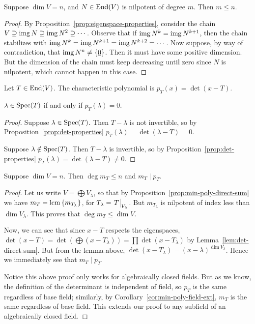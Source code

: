 \begin{lemma}\label{lem:nilpotent-degree}
    Suppose \(\dim V = n\), and \(N \in \operatorname{End}(V)\) is nilpotent of degree \(m\).
    Then \(m \leq n\).
\end{lemma}
\begin{proof}
    By Proposition~\ref{prop:eigenspace-properties},
    consider the chain \(V \supseteq \operatorname{img} N \supseteq \operatorname{img} N^2 \supseteq \cdots\).
    Observe that if \(\operatorname{img} N^k = \operatorname{img} N^{k+1}\),
    then the chain stabilizes with \(\operatorname{img} N^k = \operatorname{img} N^{k+1} = \operatorname{img} N^{k+2} = \cdots\).
    Now suppose, by way of contradiction, that \(\operatorname{img} N^n \neq \{\underline{0}\}\).
    Then it must have some positive dimension.
    But the dimension of the chain must keep decreasing until zero since \(N\) is nilpotent,
    which cannot happen in this case.
\end{proof}
\begin{definition}
    Let \(T \in \operatorname{End}(V)\).
    The characteristic polynomial is \(p_T(x) = \det(x-T)\).
\end{definition}
\begin{lemma}\label{lem:char-poly-roots}
    \(\lambda \in \operatorname{Spec}(T)\) if and only if \(p_T(\lambda) = 0\).
\end{lemma}
\begin{proof}
    Suppose \(\lambda \in \operatorname{Spec}(T)\).
    Then \(T-\lambda\) is not invertible,
    so by Proposition~\ref{prop:det-properties} \(p_T(\lambda) = \det(\lambda-T) = 0\).

    Suppose \(\lambda \notin \operatorname{Spec}(T)\).
    Then \(T-\lambda\) is invertible,
    so by Proposition~\ref{prop:det-properties} \(p_T(\lambda) = \det(\lambda-T) \neq 0\).
\end{proof}
\begin{theorem}\label{thm:cayley-hamilton}
    Suppose \(\dim V = n\).
    Then \(\deg m_T \leq n\) and \(m_T \mid p_T\).
\end{theorem}
\begin{proof}
    Let us write \(V = \bigoplus V_\lambda\),
    so that by Proposition~\ref{prop:min-poly-direct-sum} we have
    \(m_T = \operatorname{lcm}{\{m_{T_\lambda}\}}\), for \(T_\lambda = \eval{T}_{V_\lambda}\).
    But \(m_{T_\lambda}\) is nilpotent of index less than \(\dim V_\lambda\).
    This proves that \(\deg m_T \leq \dim V\).

    Now, we can see that since \(x-T\) respects the eigenspaces,
    \(\det(x-T) = \det(\bigoplus (x-T_\lambda)) = \prod \det(x-T_\lambda)\)
    by Lemma~\ref{lem:det-direct-sum}.
    But from the \hyperref[lem:char-poly-roots]{lemma above},
    \(\det(x-T_\lambda) = {(x-\lambda)}^{\dim V_\lambda}\).
    Hence we immediately see that \(m_T \mid p_T\).

    Notice this above proof only works for algebraically closed fields.
    But as we know, the definition of the determinant is independent of field,
    so \(p_T\) is the same regardless of base field;
    similarly, by Corollary~\ref{cor:min-poly-field-ext},
    \(m_T\) is the same regardless of base field.
    This extends our proof to any subfield of an algebraically closed field.
\end{proof}



